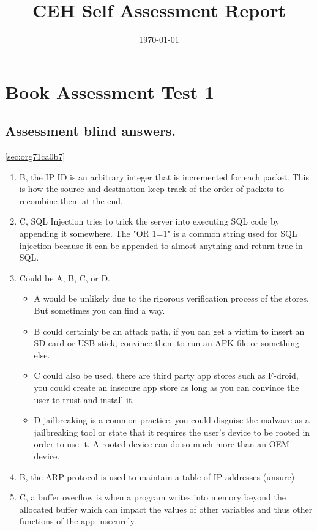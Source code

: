 \documentclass[11pt]{article}
\date{\today}
\title{CEH Self Assessment Report}
\begin{document}
\maketitle
\tableofcontents

\section{Book Assessment Test 1}
\label{sec:org2f48c3d}
\subsection{Assessment blind answers.}
\label{sec:org553115e}

\ref{sec:org71ca0b7}

\begin{enumerate}
\item B, the IP ID is an arbitrary integer that is incremented for each packet. This is how the source and destination keep track of the order of packets to recombine them at the end.
\item C, SQL Injection tries to trick the server into executing SQL code by appending it somewhere. The "OR 1=1" is a common string used for SQL injection because it can be appended to almost anything and return true in SQL.
\item Could be A, B, C, or D.
\begin{itemize}
\item A would be unlikely due to the rigorous verification process of the stores. But sometimes you can find a way.
\item B could certainly be an attack path, if you can get a victim to insert an SD card or USB stick, convince them to run an APK file or something else.
\item C could also be used, there are third party app stores such as F-droid, you could create an insecure app store as long as you can convince the user to trust and install it.
\item D jailbreaking is a common practice, you could disguise the malware as a jailbreaking tool or state that it requires the user's device to be rooted in order to use it. A rooted device can do so much more than an OEM device.
\end{itemize}
\item B, the ARP protocol is used to maintain a table of IP addresses (unsure)
\item C, a buffer overflow is when a program writes into memory beyond the allocated buffer which can impact the values of other variables and thus other functions of the app insecurely.

\end{enumerate}
\end{document}
